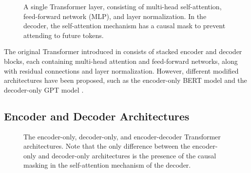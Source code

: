 \begin{figure}[h!]
    \centering


    \caption{A single Transformer layer, consisting of multi-head self-attention, feed-forward network (MLP), and layer normalization. In the decoder, the self-attention mechanism has a causal mask to prevent attending to future tokens.}
    \label{fig:transformer_layer}
\end{figure}

The original Transformer introduced in \cite{vaswani_attention_2017} consists of stacked encoder and decoder blocks, each containing multi-head attention and feed-forward networks, along with residual connections and layer normalization. However, different modified architectures have been proposed, such as the encoder-only BERT model \cite{devlin_bert_2019} and the decoder-only GPT model \cite{radford_improving_2018}.

\subsection{Encoder and Decoder Architectures}\label{subsec:types_transformers}


\begin{figure}[h!]
    \centering


    \caption{The encoder-only, decoder-only, and encoder-decoder Transformer architectures. Note that the only difference between the encoder-only and decoder-only architectures is the presence of the causal masking in the self-attention mechanism of the decoder.}
\end{figure}


